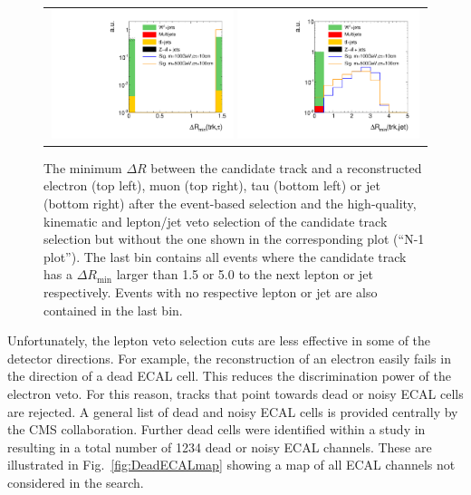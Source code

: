 \begin{figure}[!b]
\begin{tabular}{c}
    \includegraphics[width=0.49\textwidth]{figures/analysis_2/AnalysisSelection/htrackdRminTau_log.pdf}
    \includegraphics[width=0.49\textwidth]{figures/analysis_2/AnalysisSelection/htrackdRminJet_log.pdf}
  \end{tabular}
  \caption{The minimum $\Delta R$ between the candidate track and a reconstructed electron (top left), muon (top right), tau (bottom left) or jet (bottom right) 
           after the event-based selection and the high-quality, kinematic and lepton/jet veto selection of the candidate track selection but without the one shown in the corresponding plot (``N-1 plot''). 
           The last bin contains all events where the candidate track has a $\Delta R_{\text{min}}$ larger than 1.5 or 5.0 to the next lepton or jet respectively. 
           Events with no respective lepton or jet are also contained in the last bin.}
  \label{fig:TrackdRmin}
\end{figure}

Unfortunately, the lepton veto selection cuts are less effective in some of the detector directions.
For example, the reconstruction of an electron easily fails in the direction of a dead ECAL cell.
This reduces the discrimination power of the electron veto.
For this reason, tracks that point towards dead or noisy ECAL cells are rejected.
A general list of dead and noisy ECAL cells is provided centrally by the CMS collaboration.
Further dead cells were identified within a study in~\cite{bib:CMS:DT_Thesis,bib:CMS:DT_8TeV_AN} resulting in a total number of 1234 dead or noisy ECAL channels. 
These are illustrated in Fig.~\ref{fig:DeadECALmap} showing a map of all ECAL channels not considered in the search.


